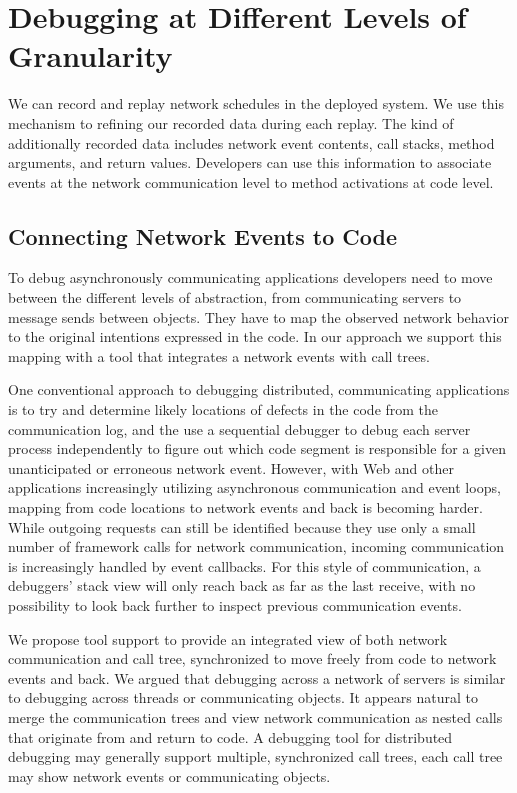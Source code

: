 \section{Debugging at Different Levels of Granularity}
\label{sec:debugg-at-diff}

We can record and replay network schedules in the deployed system. We
use this mechanism to refining our recorded data during each
replay. The kind of additionally recorded data includes network event
contents, call stacks, method arguments, and return values. Developers
can use this information to associate events at the network
communication level to method activations at code level.

\subsection{Connecting Network Events to Code}
\label{sec:moving-from-network}

To debug asynchronously communicating applications developers need to
move between the different levels of abstraction, from communicating
servers to message sends between objects. They have to map the
observed network behavior to the original intentions expressed in the
code. In our approach we support this mapping with a tool that
integrates a network events with call trees.

One conventional approach to debugging distributed, communicating
applications is to try and determine likely locations of defects in
the code from the communication log, and the use a sequential debugger
to debug each server process independently to figure out which code
segment is responsible for a given unanticipated or erroneous network
event. However, with Web and other applications increasingly utilizing
asynchronous communication and event loops, mapping from code
locations to network events and back is becoming harder. While
outgoing requests can still be identified because they use only a
small number of framework calls for network communication, incoming
communication is increasingly handled by event callbacks. For this
style of communication, a debuggers' stack view will only reach back
as far as the last receive, with no possibility to look back further
to inspect previous communication events.

We propose tool support to provide an integrated view of both network
communication and call tree, synchronized to move freely from code to
network events and back. We argued that debugging across a network of
servers is similar to debugging across threads or communicating
objects. It appears natural to merge the communication trees and view
network communication as nested calls that originate from and return
to code. A debugging tool for distributed debugging may generally
support multiple, synchronized call trees, each call tree may show
network events or communicating objects.

